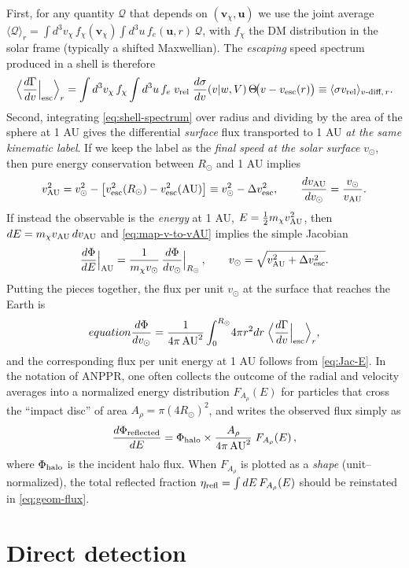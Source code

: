 \documentclass[13.1pt, letterpaper, twoside]{article}
\begin{document}
First, for any quantity $\mathcal Q$ that depends on $(\mathbf v_\chi,\mathbf u)$ we use the joint average
\(
\langle\mathcal Q\rangle_r
=\int d^3v_\chi\,f_\chi(\mathbf v_\chi)\int d^3u\,f_e(\mathbf u,r)\,\mathcal Q
\),
with $f_\chi$ the DM distribution in the solar frame (typically a shifted Maxwellian). The \emph{escaping} speed spectrum produced in a shell is therefore
\begin{equation}
    \label{eq:shell-spectrum}
    \Big\langle \Big.\frac{d\Gamma}{dv}\Big|_{\rm esc}\Big\rangle_r
    =\int d^3v_\chi\,f_\chi\int d^3u\,f_e\;
    v_{\rm rel}\;\frac{d\sigma}{dv}(v|w,V)\,\Theta\!\big(v-v_{\rm esc}(r)\big)
    \equiv \langle\sigma v_{\rm rel}\rangle_{v\text{-diff},\,r}.
\end{equation}
Second, integrating \eqref{eq:shell-spectrum} over radius and dividing by the area of the sphere at 1 AU gives the differential \emph{surface} flux transported to 1 AU \emph{at the same kinematic label}. If we keep the label as the \emph{final speed at the solar surface} $v_{\odot}$, then pure energy conservation between $R_\odot$ and 1 AU implies
\begin{equation}
    \label{eq:map-v-to-vAU}
    v^2_{\rm AU}=v_{\odot}^2-\big[v_{\rm esc}^2(R_\odot)-v_{\rm esc}^2(\mathrm{AU})\big]
    \equiv v_{\odot}^2-\Delta v_{\rm esc}^2,
    \qquad
    \frac{d v_{\rm AU}}{dv_{\odot}}=\frac{v_{\odot}}{v_{\rm AU}}.
\end{equation}
If instead the observable is the \emph{energy} at 1 AU, $E=\tfrac12 m_\chi v_{\rm AU}^2$, then $dE=m_\chi v_{\rm AU}\,dv_{\rm AU}$ and \eqref{eq:map-v-to-vAU} implies the simple Jacobian
\begin{equation}
    \label{eq:Jac-E}
    \frac{d\Phi}{dE}\Big|_{\rm AU}
    =\frac{1}{m_\chi v_\odot}\,\frac{d\Phi}{dv_\odot}\Big|_{R_\odot}\,,
    \qquad
    v_\odot=\sqrt{v_{\rm AU}^2+\Delta v_{\rm esc}^2}.
\end{equation}
Putting the pieces together, the flux per unit $v_\odot$ at the surface that reaches the Earth is
\begin{equation}[box=\fbox]{equation}
    \label{eq:flux-at-surface}
    \frac{d\Phi}{dv_\odot}
    =\frac{1}{4\pi\,\mathrm{AU}^2}\int_0^{R_\odot}\!4\pi r^2dr\;
    \Big\langle \Big.\frac{d\Gamma}{dv}\Big|_{\rm esc}\Big\rangle_r,
\end{equation}
and the corresponding flux per unit energy at 1 AU follows from \eqref{eq:Jac-E}. In the notation of ANPPR, one often collects the outcome of the radial and velocity averages into a normalized energy distribution $F_{A_\rho}(E)$ for particles that cross the ``impact disc'' of area $A_\rho=\pi(4R_\odot)^2$, and writes the observed flux simply as
\begin{equation}
    \label{eq:geom-flux}
    \frac{d\Phi_{\rm reflected}}{dE}
    =\Phi_{\rm halo}\times \frac{A_\rho}{4\pi\,\mathrm{AU}^2}\;F_{A_\rho}(E)\,,
\end{equation}
where $\Phi_{\rm halo}$ is the incident halo flux. When $F_{A_\rho}$ is plotted as a \emph{shape} (unit–normalized), the total reflected fraction $\eta_{\rm refl}=\int dE\,F_{A_\rho}(E)$ should be reinstated in \eqref{eq:geom-flux}.


\section{Direct detection}
\end{document}
